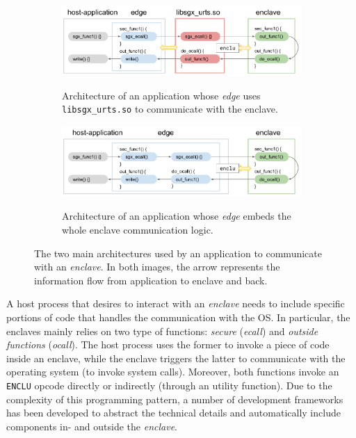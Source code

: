 \begin{figure}[t]
	\centering
	\begin{subfigure}[b]{0.9\linewidth}
		\centering
		\includegraphics[width=\textwidth]{fig_c7/sgxprogrammingpattern_library.pdf}
		\\[1em]
		\caption{Architecture of an application whose \emph{edge}
			uses \texttt{libsgx\_urts.so} to communicate with the enclave.}
		\label{fig:sgxprogrammingpattern_library}
	\end{subfigure}
	\hfill
	\begin{subfigure}[b]{0.9\linewidth}
		\centering
		\includegraphics[width=\textwidth]{fig_c7/sgxprogrammingpattern_static.pdf}
		\\[1em]
		\caption{Architecture of an application whose \emph{edge}
			embeds the whole enclave communication logic.}
		\label{fig:sgxprogrammingpattern_static}
	\end{subfigure}
	\caption[Development frameworks' architecture.]{The two main architectures 
	used by an application to communicate with an \emph{enclave}. In both 
	images, the arrow represents the information flow from application to 
	enclave and back.}
	\label{fig:sgxprogrammingpattern}
\end{figure}

A host process that desires to interact with an \emph{enclave} needs to
include specific portions of code that handles the communication with the OS.
In particular, the enclaves mainly relies on two type of functions: 
\emph{secure} (\emph{ecall}) and \emph{outside	functions} (\emph{ocall}). 
The host process uses the former to invoke a piece of code inside an enclave, 
while the enclave triggers the latter to communicate with the operating system 
(\eg to invoke system calls). 
Moreover, both functions invoke an \texttt{ENCLU} opcode directly or indirectly
(\ie through an utility function).
Due to the complexity of this programming pattern, a number
of development frameworks has been developed to abstract the technical
details and automatically include components in- and outside the
\emph{enclave}.

